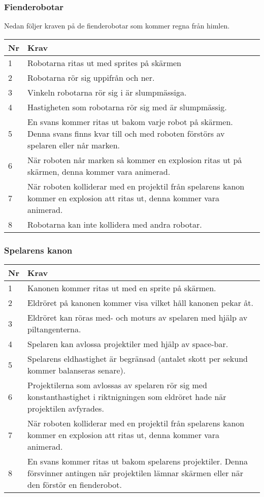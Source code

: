 \documentclass{TDP003mall}
\begin{document}
\subsubsection{Fienderobotar}
Nedan följer kraven på de fienderobotar som kommer regna från himlen.
\begin{table}[!h]
\begin{tabularx}{\linewidth}{|l|X|}
\hline
Nr & Krav\\\hline
1 & Robotarna ritas ut med sprites på skärmen \\\hline
2 & Robotarna rör sig uppifrån och ner.\\\hline
3 & Vinkeln robotarna rör sig i är slumpmässiga.\\\hline
4 & Hastigheten som robotarna rör sig med är slumpmässig.\\\hline
5 & En svans kommer ritas ut bakom varje robot på skärmen. Denna svans finns kvar till och med roboten förstörs av spelaren eller når marken.\\\hline
6 & När roboten når marken så kommer en explosion ritas ut på skärmen, denna kommer vara animerad.\\\hline
7 & När roboten kolliderar med en projektil från spelarens kanon kommer en explosion att ritas ut, denna kommer vara animerad.\\\hline
8 & Robotarna kan inte kollidera med andra robotar.\\\hline
\end{tabularx}
\end{table}

\newpage

\subsubsection{Spelarens kanon}
\begin{table}[!h]
\begin{tabularx}{\linewidth}{|l|X|}
\hline
Nr & Krav\\\hline
1 & Kanonen kommer ritas ut med en sprite på skärmen.\\\hline
2 & Eldröret på kanonen kommer visa vilket håll kanonen pekar åt.\\\hline
3 & Eldröret kan röras med- och moturs av spelaren med hjälp av piltangenterna.\\\hline
4 & Spelaren kan avlossa projektiler med hjälp av space-bar.\\\hline
5 & Spelarens eldhastighet är begränsad (antalet skott per sekund kommer balanseras senare).\\\hline
6 & Projektilerna som avlossas av spelaren rör sig med konstanthastighet i riktnigningen som eldröret hade när projektilen avfyrades.\\\hline
7 & När roboten kolliderar med en projektil från spelarens kanon kommer en explosion att ritas ut, denna kommer vara animerad.\\\hline
8 & En svans kommer ritas ut bakom spelarens projektiler. Denna försvinner antingen när projektilen lämnar skärmen eller när den förstör en fienderobot.\\\hline
\end{tabularx}
\end{table}
\end{document}
